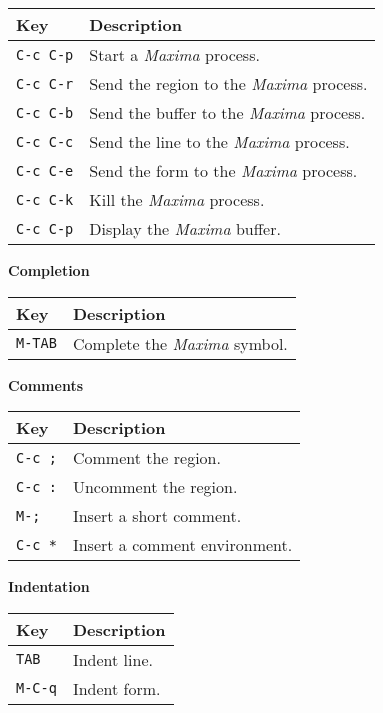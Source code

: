 \documentclass{article}
\newcommand{\mx}{\textsl{\sffamily Maxima}}
\begin{document}
\noindent
\begin{tabular}{p{\firstcol}p{\secondcol}}
\hline
\textbf{Key} & \textbf{Description}\\
\hline
\texttt{C-c C-p} & Start a \mx{} process.\\
\texttt{C-c C-r} & Send the region to the \mx{} process.\\
\texttt{C-c C-b} & Send the buffer to the \mx{} process.\\
\texttt{C-c C-c} & Send the line to the \mx{} process.\\
\texttt{C-c C-e} & Send the form to the \mx{} process.\\
\texttt{C-c C-k} & Kill the \mx{} process.\\
\texttt{C-c C-p} & Display the \mx{} buffer.
\end{tabular}

\smallskip

\noindent
\textbf{Completion}

\smallskip

\noindent
\begin{tabular}{p{\firstcol}p{\secondcol}}
\hline
\textbf{Key} & \textbf{Description}\\
\hline
\texttt{M-TAB} & Complete the \mx{} symbol.\\
\end{tabular}

\newpage

\noindent
\textbf{Comments}

\smallskip

\noindent
\begin{tabular}{p{\firstcol}p{\secondcol}}
\hline
\textbf{Key} & \textbf{Description}\\
\hline
\texttt{C-c ;} & Comment the region.\\
\texttt{C-c :} & Uncomment the region.\\
\texttt{M-;} & Insert a short comment.\\
\texttt{C-c *} & Insert a comment environment.
\end{tabular}


\smallskip

\noindent
\textbf{Indentation}

\smallskip

\noindent
\begin{tabular}{p{\firstcol}p{\secondcol}}
\hline
\textbf{Key} & \textbf{Description}\\
\hline
\texttt{TAB} & Indent line.\\
\texttt{M-C-q} & Indent form.
\end{tabular}
\end{document}
